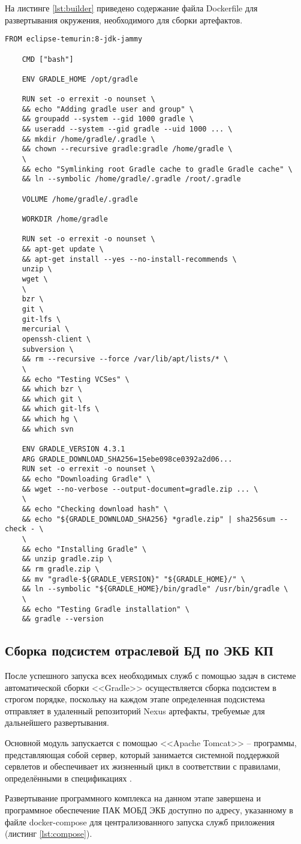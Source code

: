 На листинге \ref{lst:builder} приведено содержание файла Dockerfile для развертывания окружения, необходимого для сборки артефактов.
\begin{lstlisting}[label=lst:builder,caption=Dockerfile для для службы builder]
	FROM eclipse-temurin:8-jdk-jammy
	
	CMD ["bash"]
	
	ENV GRADLE_HOME /opt/gradle
	
	RUN set -o errexit -o nounset \
	&& echo "Adding gradle user and group" \
	&& groupadd --system --gid 1000 gradle \
	&& useradd --system --gid gradle --uid 1000 ... \
	&& mkdir /home/gradle/.gradle \
	&& chown --recursive gradle:gradle /home/gradle \
	\
	&& echo "Symlinking root Gradle cache to gradle Gradle cache" \
	&& ln --symbolic /home/gradle/.gradle /root/.gradle
	
	VOLUME /home/gradle/.gradle
	
	WORKDIR /home/gradle
	
	RUN set -o errexit -o nounset \
	&& apt-get update \
	&& apt-get install --yes --no-install-recommends \
	unzip \
	wget \
	\
	bzr \
	git \
	git-lfs \
	mercurial \
	openssh-client \
	subversion \
	&& rm --recursive --force /var/lib/apt/lists/* \
	\
	&& echo "Testing VCSes" \
	&& which bzr \
	&& which git \
	&& which git-lfs \
	&& which hg \
	&& which svn
	
	ENV GRADLE_VERSION 4.3.1
	ARG GRADLE_DOWNLOAD_SHA256=15ebe098ce0392a2d06...
	RUN set -o errexit -o nounset \
	&& echo "Downloading Gradle" \
	&& wget --no-verbose --output-document=gradle.zip ... \
	\
	&& echo "Checking download hash" \
	&& echo "${GRADLE_DOWNLOAD_SHA256} *gradle.zip" | sha256sum --check - \
	\
	&& echo "Installing Gradle" \
	&& unzip gradle.zip \
	&& rm gradle.zip \
	&& mv "gradle-${GRADLE_VERSION}" "${GRADLE_HOME}/" \
	&& ln --symbolic "${GRADLE_HOME}/bin/gradle" /usr/bin/gradle \
	\
	&& echo "Testing Gradle installation" \
	&& gradle --version
\end{lstlisting}

\subsection{Сборка подсистем отраслевой БД по ЭКБ КП}
После успешного запуска всех необходимых служб с помощью задач в системе автоматической сборки <<Gradle>> \cite{gradle} осуществляется сборка подсистем в строгом порядке, поскольку на каждом этапе определенная подсистема отправляет в удаленный репозиторий Nexus артефакты, требуемые для дальнейшего развертывания. 

Основной модуль запускается с помощью <<Apache Tomcat>> -- программы, представляющая собой сервер, который занимается системной поддержкой сервлетов и обеспечивает их жизненный цикл в соответствии с правилами, определёнными в спецификациях \cite{tomcat}. 

Развертывание программного комплекса на данном этапе завершена и программное обеспечение ПАК МОБД ЭКБ доступно по адресу, указанному в файле docker-compose для централизованного запуска служб приложения (листинг \ref{lst:compose}).